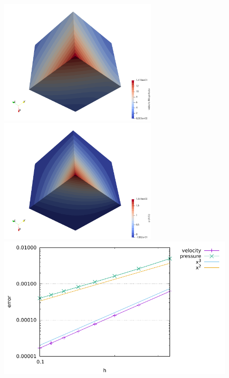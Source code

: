 \begin{center}
\includegraphics[width=8cm]{python_codes/fieldstone_17/results_isoviscous/velocity}
\includegraphics[width=8cm]{python_codes/fieldstone_17/results_isoviscous/pressure}\\
\includegraphics[width=12cm]{python_codes/fieldstone_17/results_isoviscous/errors.pdf}
\end{center}



